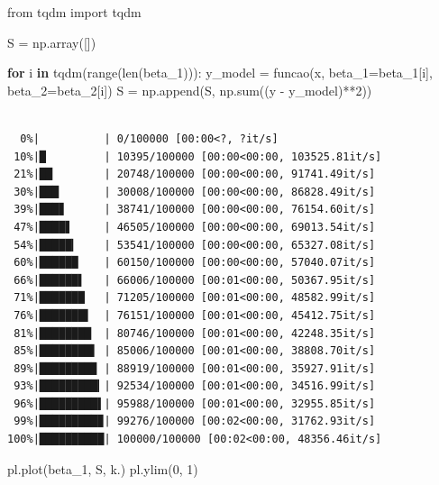 \documentclass[
  letterpaper,
  DIV=11,
  numbers=noendperiod]{scrreprt}
\newenvironment{Shaded}{\begin{snugshade}}{\end{snugshade}}
\newcommand{\BuiltInTok}[1]{\textcolor[rgb]{0.00,0.23,0.31}{#1}}
\newcommand{\ControlFlowTok}[1]{\textcolor[rgb]{0.00,0.23,0.31}{\textbf{#1}}}
\newcommand{\DecValTok}[1]{\textcolor[rgb]{0.68,0.00,0.00}{#1}}
\newcommand{\ImportTok}[1]{\textcolor[rgb]{0.00,0.46,0.62}{#1}}
\newcommand{\KeywordTok}[1]{\textcolor[rgb]{0.00,0.23,0.31}{\textbf{#1}}}
\newcommand{\NormalTok}[1]{\textcolor[rgb]{0.00,0.23,0.31}{#1}}
\newcommand{\OperatorTok}[1]{\textcolor[rgb]{0.37,0.37,0.37}{#1}}
\newcommand{\StringTok}[1]{\textcolor[rgb]{0.13,0.47,0.30}{#1}}
\begin{document}
\begin{Shaded}
\begin{Highlighting}[]
\ImportTok{from}\NormalTok{ tqdm }\ImportTok{import}\NormalTok{ tqdm}

\NormalTok{S }\OperatorTok{=}\NormalTok{ np.array([])}

\ControlFlowTok{for}\NormalTok{ i }\KeywordTok{in}\NormalTok{ tqdm(}\BuiltInTok{range}\NormalTok{(}\BuiltInTok{len}\NormalTok{(beta\_1))): }
\NormalTok{    y\_model }\OperatorTok{=}\NormalTok{ funcao(x, beta\_1}\OperatorTok{=}\NormalTok{beta\_1[i], beta\_2}\OperatorTok{=}\NormalTok{beta\_2[i])}
\NormalTok{    S }\OperatorTok{=}\NormalTok{ np.append(S, np.}\BuiltInTok{sum}\NormalTok{((y }\OperatorTok{{-}}\NormalTok{ y\_model)}\OperatorTok{**}\DecValTok{2}\NormalTok{))}
\end{Highlighting}
\end{Shaded}

\begin{verbatim}

  0%|          | 0/100000 [00:00<?, ?it/s]
 10%|█         | 10395/100000 [00:00<00:00, 103525.81it/s]
 21%|██        | 20748/100000 [00:00<00:00, 91741.49it/s] 
 30%|███       | 30008/100000 [00:00<00:00, 86828.49it/s]
 39%|███▊      | 38741/100000 [00:00<00:00, 76154.60it/s]
 47%|████▋     | 46505/100000 [00:00<00:00, 69013.54it/s]
 54%|█████▎    | 53541/100000 [00:00<00:00, 65327.08it/s]
 60%|██████    | 60150/100000 [00:00<00:00, 57040.07it/s]
 66%|██████▌   | 66006/100000 [00:01<00:00, 50367.95it/s]
 71%|███████   | 71205/100000 [00:01<00:00, 48582.99it/s]
 76%|███████▌  | 76151/100000 [00:01<00:00, 45412.75it/s]
 81%|████████  | 80746/100000 [00:01<00:00, 42248.35it/s]
 85%|████████▌ | 85006/100000 [00:01<00:00, 38808.70it/s]
 89%|████████▉ | 88919/100000 [00:01<00:00, 35927.91it/s]
 93%|█████████▎| 92534/100000 [00:01<00:00, 34516.99it/s]
 96%|█████████▌| 95988/100000 [00:01<00:00, 32955.85it/s]
 99%|█████████▉| 99276/100000 [00:02<00:00, 31762.93it/s]
100%|██████████| 100000/100000 [00:02<00:00, 48356.46it/s]
\end{verbatim}

\begin{Shaded}
\begin{Highlighting}[]
\NormalTok{pl.plot(beta\_1, S, }\StringTok{\textquotesingle{}k.\textquotesingle{}}\NormalTok{)}
\NormalTok{pl.ylim(}\DecValTok{0}\NormalTok{, }\DecValTok{1}\NormalTok{)}
\end{Highlighting}
\end{Shaded}
\end{document}
